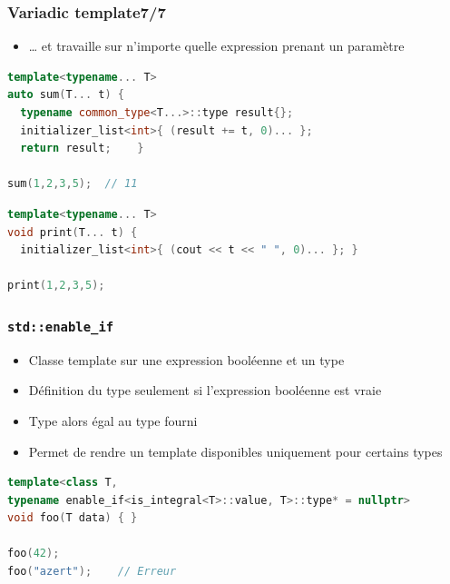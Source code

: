 \documentclass[C++.tex]{subfiles}
\begin{document}
\begin{frame}[fragile]
	\frametitle{Variadic template\titlehfill{}7/7}
	\begin{itemize}
		\item \ldots{} et travaille sur n'importe quelle expression prenant un paramètre

	\end{itemize}

	\begin{lstlisting}[language=C++]
template<typename... T>
auto sum(T... t) {
  typename common_type<T...>::type result{};
  initializer_list<int>{ (result += t, 0)... };
  return result; 	}

sum(1,2,3,5);  // 11\end{lstlisting}

	\begin{lstlisting}[language=C++]
template<typename... T>
void print(T... t) {
  initializer_list<int>{ (cout << t << " ", 0)... }; }

print(1,2,3,5);\end{lstlisting}
\end{frame}

\begin{frame}[fragile]
	\frametitle{\lstinline|std::enable_if|}
	\begin{itemize}
		\item Classe template sur une expression booléenne et un type
		\item Définition du type seulement si l'expression booléenne est vraie
		\item Type alors égal au type fourni
		\item Permet de rendre un template disponibles uniquement pour certains types
	\end{itemize}

	\begin{lstlisting}[language=C++]
template<class T, 
typename enable_if<is_integral<T>::value, T>::type* = nullptr>
void foo(T data) { }

foo(42);
foo("azert");    // Erreur\end{lstlisting}
\end{frame}
\end{document}
